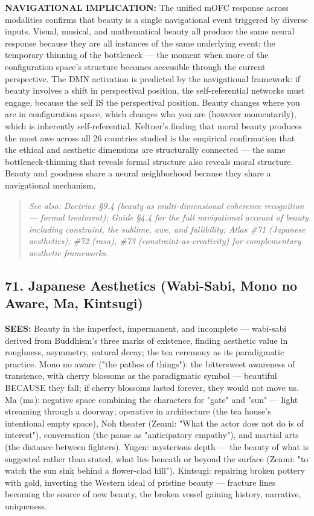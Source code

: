 \textbf{NAVIGATIONAL IMPLICATION:} The unified mOFC response across modalities confirms that beauty is a single navigational event triggered by diverse inputs. Visual, musical, and mathematical beauty all produce the same neural response because they are all instances of the same underlying event: the temporary thinning of the bottleneck — the moment when more of the configuration space's structure becomes accessible through the current perspective. The DMN activation is predicted by the navigational framework: if beauty involves a shift in perspectival position, the self-referential networks must engage, because the self IS the perspectival position. Beauty changes where you are in configuration space, which changes who you are (however momentarily), which is inherently self-referential. Keltner's finding that moral beauty produces the most awe across all 26 countries studied is the empirical confirmation that the ethical and aesthetic dimensions are structurally connected — the same bottleneck-thinning that reveals formal structure also reveals moral structure. Beauty and goodness share a neural neighborhood because they share a navigational mechanism.


\begin{quote}
\itshape
\textit{See also: Doctrine §9.4 (beauty as multi-dimensional coherence recognition — formal treatment); Guide §4.4 for the full navigational account of beauty including constraint, the sublime, awe, and fallibility; Atlas \#71 (Japanese aesthetics), \#72 (rasa), \#73 (constraint-as-creativity) for complementary aesthetic frameworks.}
\end{quote}


\bigskip\noindent\makebox[\textwidth]{\color{rulegray}\rule{5cm}{0.3pt}}\bigskip


\subsection*{71. Japanese Aesthetics (Wabi-Sabi, Mono no Aware, Ma, Kintsugi)}


\textbf{SEES:} Beauty in the imperfect, impermanent, and incomplete — wabi-sabi derived from Buddhism's three marks of existence, finding aesthetic value in roughness, asymmetry, natural decay; the tea ceremony as its paradigmatic practice. Mono no aware ("the pathos of things"): the bittersweet awareness of transience, with cherry blossoms as the paradigmatic symbol — beautiful BECAUSE they fall; if cherry blossoms lasted forever, they would not move us. Ma ({ma}): negative space combining the characters for "gate" and "sun" — light streaming through a doorway; operative in architecture (the tea house's intentional empty space), Noh theater (Zeami: "What the actor does not do is of interest"), conversation (the pause as "anticipatory empathy"), and martial arts (the distance between fighters). Yugen: mysterious depth — the beauty of what is suggested rather than stated, what lies beneath or beyond the surface (Zeami: "to watch the sun sink behind a flower-clad hill"). Kintsugi: repairing broken pottery with gold, inverting the Western ideal of pristine beauty — fracture lines becoming the source of new beauty, the broken vessel gaining history, narrative, uniqueness.


